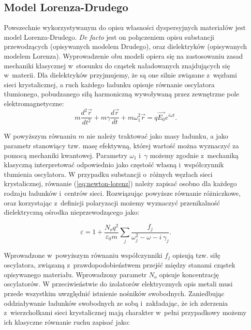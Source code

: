 \subsection{Model Lorenza-Drudego}
\label{subart:lorenz-drude}
Powszechnie wykorzystywanym do opisu własności dyspersyjnych materiałów jest model Lorenza-Drudego. \textit{De facto} jest on połączeniem opisu substancji przewodzących (opisywanych modelem Drudego), oraz dielektryków (opisywanych modelem Lorenza). Wyprowadzenie obu modeli opiera się na zastosowaniu zasad mechaniki klasycznej w~stosunku do cząstek naładowanych znajdujących się w~materii. Dla dielektryków przyjmujemy, że są one silnie związane z~węzłami sieci krystalicznej, a ruch każdego ładunku opisuje równanie oscylatora tłumionego, pobudzanego siłą harmoniczną wywoływaną przez zewnętrzne pole elektromagnetyczne:
\begin{equation}
m \frac{d^2 \vec{r}}{dt^2} + m \gamma \frac{d \vec{r}}{dt} + m \omega^2_1 \vec{r} = q \vec{E_0} e^{i \omega t}.
\label{eq:newton-lorenz}
\end{equation}

W powyższym równaniu $m$ nie należy traktować jako masy ładunku, a jako parametr stanowiący tzw. masę efektywną, której wartość można wyznaczyć za pomocą mechaniki kwantowej. Parametry $\omega_1$ i~$\gamma$ możemy zgodnie z~mechaniką klasyczną interpretować odpowiednio jako częstość własną i~współczynnik tłumienia oscylatora. W przypadku substancji o~różnych węzłach sieci krystalicznej, równanie (\ref{eq:newton-lorenz}) należy zapisać osobno dla każdego rodzaju ładunków i~centrów sieci. Rozwiązując powyższe równanie różniczkowe, oraz korzystając z~definicji polaryzacji możemy wyznaczyć przenikalność dielektryczną ośrodka nieprzewodzącego jako:

\begin{equation}
\varepsilon = 1 + \frac{N_o q^2}{\varepsilon_0 m} \sum_j \frac{f_j}{\omega_j^2 - \omega - i~\gamma_j}.
\label{eq:lorenz}
\end{equation}

Wprowadzone w~powyższym równaniu współczynniki $f_j$ opisują tzw. siłę oscylatora, związaną z~prawdopodobieństwem przejść między stanami cząstek opisywanego materiału. Wprowadzony parametr $N_o$ opisuje koncentrację oscylatorów.  W przeciwieństwie do izolatorów elektrycznych opis metali musi przede wszystkim uwzględnić istnienie nośników swobodnych. Zaniedbując oddziaływanie ładunków swobodnych ze sobą i~zakładając, że ich zderzenia z~wierzchołkami sieci krystalicznej mają charakter w~pełni przypadkowy możemy ich klasyczne równanie ruchu zapisać jako:


